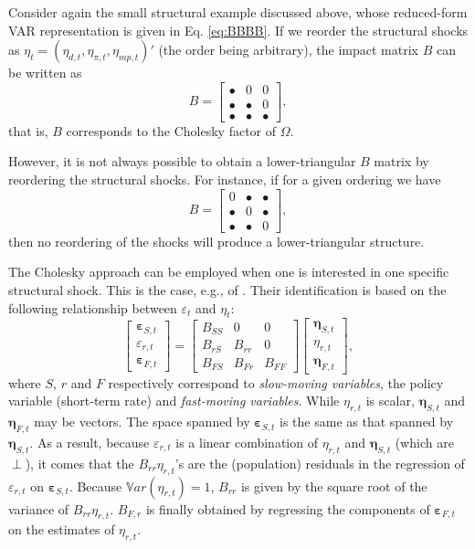 \documentclass[
  12pt,
]{book}
\theoremstyle{definition}
\theoremstyle{definition}
\theoremstyle{definition}
\theoremstyle{definition}
\theoremstyle{remark}
\begin{document}
Consider again the small structural example discussed above, whose reduced-form VAR representation is given in Eq. \eqref{eq:BBBB}. If we reorder the structural shocks as \(\eta_t = (\eta_{d,t},\eta_{\pi,t},\eta_{mp,t})'\) (the order being arbitrary), the impact matrix \(B\) can be written as
\[
B = \begin{bmatrix}
\bullet & 0 & 0 \\
\bullet & \bullet & 0 \\
\bullet & \bullet & \bullet
\end{bmatrix},
\]
that is, \(B\) corresponds to the Cholesky factor of \(\Omega\).

However, it is not always possible to obtain a lower-triangular \(B\) matrix by reordering the structural shocks. For instance, if for a given ordering we have
\[
B = \begin{bmatrix}
0 & \bullet & \bullet \\
\bullet & 0 & \bullet \\
\bullet & \bullet & 0
\end{bmatrix},
\]
then no reordering of the shocks will produce a lower-triangular structure.

The Cholesky approach can be employed when one is interested in one specific structural shock. This is the case, e.g., of \citet{Christiano_Eichenbaum_Evans_1996}. Their identification is based on the following relationship between \(\varepsilon_t\) and \(\eta_t\):
\[
\left[\begin{array}{c}
\boldsymbol\varepsilon_{S,t}\\
\varepsilon_{r,t}\\
\boldsymbol\varepsilon_{F,t}
\end{array}\right] =
\left[\begin{array}{ccc}
B_{SS} & 0 & 0 \\
B_{rS} & B_{rr} & 0 \\
B_{FS} & B_{Fr} & B_{FF}
\end{array}\right]
\left[\begin{array}{c}
\boldsymbol\eta_{S,t}\\
\eta_{r,t}\\
\boldsymbol\eta_{F,t}
\end{array}\right],
\]
where \(S\), \(r\) and \(F\) respectively correspond to \emph{slow-moving variables}, the policy variable (short-term rate) and \emph{fast-moving variables}. While \(\eta_{r,t}\) is scalar, \(\boldsymbol\eta_{S,t}\) and \(\boldsymbol\eta_{F,t}\) may be vectors. The space spanned by \(\boldsymbol\varepsilon_{S,t}\) is the same as that spanned by \(\boldsymbol\eta_{S,t}\). As a result, because \(\varepsilon_{r,t}\) is a linear combination of \(\eta_{r,t}\) and \(\boldsymbol\eta_{S,t}\) (which are \(\perp\)), it comes that the \(B_{rr}\eta_{r,t}\)'s are the (population) residuals in the regression of \(\varepsilon_{r,t}\) on \(\boldsymbol\varepsilon_{S,t}\). Because \(\mathbb{V}ar(\eta_{r,t})=1\), \(B_{rr}\) is given by the square root of the variance of \(B_{rr}\eta_{r,t}\). \(B_{F,r}\) is finally obtained by regressing the components of \(\boldsymbol\varepsilon_{F,t}\) on the estimates of \(\eta_{r,t}\).
\end{document}
